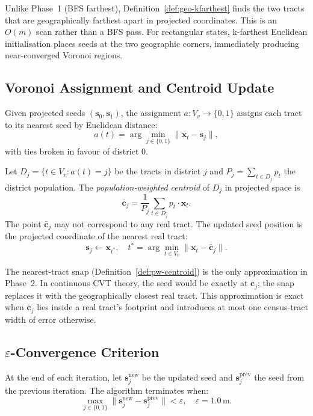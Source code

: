 Unlike Phase~1 (BFS farthest), Definition~\ref{def:geo-kfarthest} finds the
two tracts that are geographically farthest apart in projected coordinates.
This is an $O(m)$ scan rather than a BFS pass.
For rectangular states, k-farthest Euclidean initialisation places seeds at
the two geographic corners, immediately producing near-converged Voronoi
regions.

\subsection{Voronoi Assignment and Centroid Update}

\begin{definition}
\label{def:euc-voronoi}
Given projected seeds $(\mathbf{s}_0, \mathbf{s}_1)$, the assignment
$a: V_v \to \{0,1\}$ assigns each tract to its nearest seed by Euclidean distance:
\[
  a(t) = \arg\min_{j \in \{0,1\}} \|\mathbf{x}_t - \mathbf{s}_j\|,
\]
with ties broken in favour of district 0.
\end{definition}

\begin{definition}
\label{def:pw-centroid}
Let $D_j = \{t \in V_v : a(t) = j\}$ be the tracts in district $j$ and
$P_j = \sum_{t \in D_j} p_t$ the district population.
The \emph{population-weighted centroid} of $D_j$ in projected space is
\[
  \bar{\mathbf{c}}_j = \frac{1}{P_j}\sum_{t \in D_j} p_t \cdot \mathbf{x}_t.
\]
The point $\bar{\mathbf{c}}_j$ may not correspond to any real tract.
The updated seed position is the projected coordinate of the nearest real tract:
\[
  \mathbf{s}_j \leftarrow \mathbf{x}_{t^*},
  \quad t^* = \arg\min_{t \in V_v} \|\mathbf{x}_t - \bar{\mathbf{c}}_j\|.
\]
\end{definition}

The nearest-tract snap (Definition~\ref{def:pw-centroid}) is the only
approximation in Phase~2.
In continuous CVT theory, the seed would be exactly at $\bar{\mathbf{c}}_j$;
the snap replaces it with the geographically closest real tract.
This approximation is exact when $\bar{\mathbf{c}}_j$ lies inside a real tract's
footprint and introduces at most one census-tract width of error otherwise.

\subsection{$\varepsilon$-Convergence Criterion}

\begin{definition}
\label{def:eps-convergence}
At the end of each iteration, let $\mathbf{s}_j^{\mathrm{new}}$ be the updated
seed and $\mathbf{s}_j^{\mathrm{prev}}$ the seed from the previous iteration.
The algorithm terminates when:
\[
  \max_{j \in \{0,1\}} \|\mathbf{s}_j^{\mathrm{new}} - \mathbf{s}_j^{\mathrm{prev}}\| < \varepsilon,
  \quad \varepsilon = 1.0\,\mathrm{m}.
\]
\end{definition}

